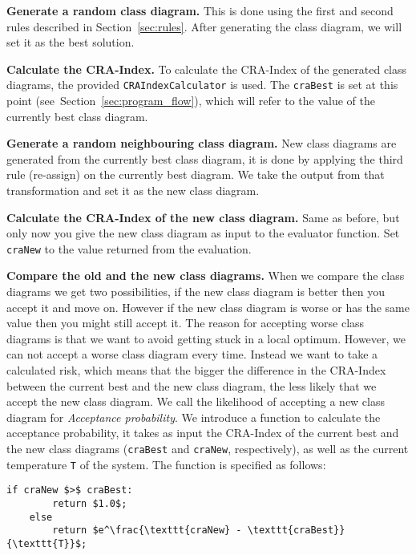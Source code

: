 \documentclass[a4paper]{article}
\begin{document}
\begin{description}
	
\item{\textbf{Generate a random class diagram.}}
This is done using the first and second rules described in Section~\ref{sec:rules}.
After generating the class diagram, we will set it as the best solution.

\item{\textbf{Calculate the CRA-Index.}}
To calculate the CRA-Index of the generated class diagrams, the provided \texttt{CRAIndexCalculator} is used.
The \texttt{craBest} is set at this point (see~Section~\ref{sec:program_flow}), which will refer to the value of the currently best class diagram.

\item{\textbf{Generate a random neighbouring class diagram.}}
New class diagrams are generated from the currently best class diagram, it is
done by applying the third rule (re-assign) on the currently best diagram.
We take the output from that transformation and set it as the new class diagram.

\item{\textbf{Calculate the CRA-Index of the new class diagram.}}
Same as before, but only now you give the new class diagram as input to the
evaluator function.
Set \texttt{craNew} to the value returned from the evaluation.

\item{\textbf{Compare the old and the new class diagrams.}}
When we compare the class diagrams we get two possibilities, if the new class diagram is better then you accept it and move on.
However if the new class diagram is worse or has the same value then you might still accept it.
The reason for accepting worse class diagrams is that we want to avoid getting stuck in a local optimum.
However, we can not accept a worse class diagram every time.
Instead we want to take a calculated risk, which means that the bigger the difference in the CRA-Index between the current best and the new class diagram, the less likely that we accept the new class diagram.
We call the likelihood of accepting a new class diagram for \textit{Acceptance probability}.
We introduce a function to calculate the acceptance probability, it takes as input the CRA-Index of the current best and the new class diagrams (\texttt{craBest} and \texttt{craNew}, respectively), as well as the current temperature \texttt{T} of the system.
The function is specified as follows:

\begin{lstlisting}[mathescape=true]
	if craNew $>$ craBest:
		return $1.0$;
	else
		return $e^\frac{\texttt{craNew} - \texttt{craBest}}{\texttt{T}}$;
\end{lstlisting}


\end{description}
\end{document}
